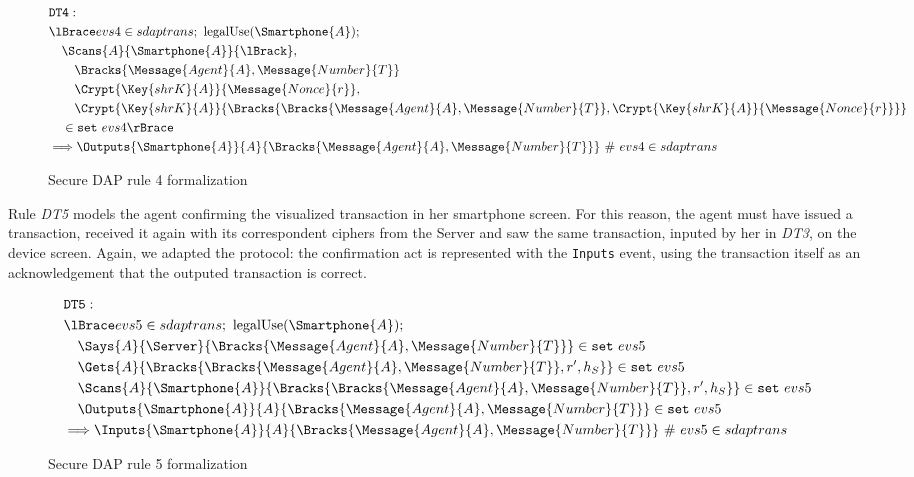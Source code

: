 \begin{figure}[!h]
  \begin{align*}
    & \texttt{DT4}: \newline \\
    & \lBrace evs4 \in sdaptrans;\ \text{legalUse}(\Smartphone{A}); \\
    & \quad \Scans{A}{\Smartphone{A}}{\lBrack}, \\
    & \qquad \Bracks{\Message{Agent}{A}, \Message{Number}{T}} \\
    & \qquad \Crypt{\Key{shrK}{A}}{\Message{Nonce}{r}}, \\
    & \qquad \Crypt{\Key{shrK}{A}}{\Bracks{\Bracks{\Message{Agent}{A}, \Message{Number}{T}}, \Crypt{\Key{shrK}{A}}{\Message{Nonce}{r}}}} \\
    & \quad \in \texttt{set} \ evs4 \rBrace \\
    & \Longrightarrow \Outputs{\Smartphone{A}}{A}{\Bracks{\Message{Agent}{A}, \Message{Number}{T}}} \ \# \ evs4 \in sdaptrans
  \end{align*}
  \label{fig:dap-model-4}
  \caption{Secure DAP rule 4 formalization}
\end{figure}

Rule \textit{DT5} models the agent confirming the visualized transaction in her smartphone screen. For this reason, the agent must have issued a transaction, received it again with its correspondent ciphers from the Server and saw the same transaction, inputed by her in \textit{DT3}, on the device screen. Again, we adapted the protocol: the confirmation act is represented with the \texttt{Inputs} event, using the transaction itself as an acknowledgement that the outputed transaction is correct.

\begin{figure}[!h]
  \begin{align*}
    & \texttt{DT5}: \newline \\
    & \lBrace evs5 \in sdaptrans;\ \text{legalUse}(\Smartphone{A}); \\
    & \quad \Says{A}{\Server}{\Bracks{\Message{Agent}{A}, \Message{Number}{T}}} \in \texttt{set} \ evs5 \\
    & \quad \Gets{A}{\Bracks{\Bracks{\Message{Agent}{A}, \Message{Number}{T}}, r', h_S}} \in \texttt{set} \ evs5 \\
    & \quad \Scans{A}{\Smartphone{A}}{\Bracks{\Bracks{\Message{Agent}{A}, \Message{Number}{T}}, r', h_S}} \in \texttt{set} \ evs5 \\
    & \quad \Outputs{\Smartphone{A}}{A}{\Bracks{\Message{Agent}{A}, \Message{Number}{T}}} \in \texttt{set} \ evs5 \\
    & \Longrightarrow \Inputs{\Smartphone{A}}{A}{\Bracks{\Message{Agent}{A}, \Message{Number}{T}}} \ \# \ evs5 \in sdaptrans
  \end{align*}
  \label{fig:dap-model-5}
  \caption{Secure DAP rule 5 formalization}
\end{figure}

